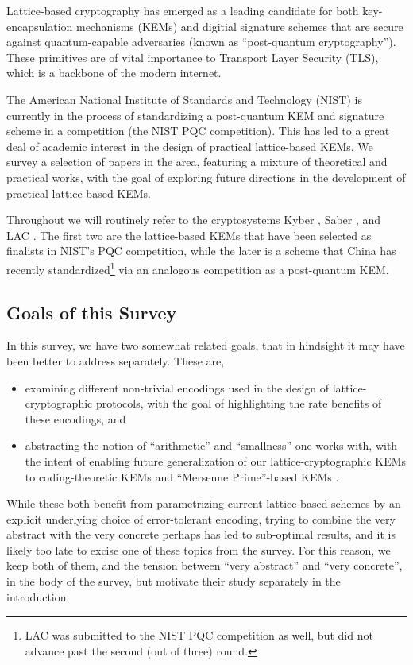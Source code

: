 Lattice-based cryptography has emerged as a leading candidate for both key-encapsulation mechanisms (KEMs) and digitial signature schemes that are secure against quantum-capable adversaries (known as ``post-quantum cryptography''). These primitives are of vital importance to Transport Layer Security (TLS), which is a backbone of the modern internet. 

The American National Institute of Standards and Technology (NIST) is currently in the process of standardizing a post-quantum KEM and signature scheme in a competition (the NIST PQC competition).
This has led to a great deal of academic interest in the design of practical lattice-based KEMs.
We survey a selection of papers in the area, featuring a mixture of theoretical and practical works, with the goal of exploring future directions in the development of practical lattice-based KEMs.

Throughout we will routinely refer to the cryptosystems Kyber \cite{KYBER-spec}, Saber \cite{AFRICACRYPT:DKRV18}, and LAC \cite{EPRINT:LLZJXHLW18}. The first two are the lattice-based KEMs that have been selected as finalists in NIST's PQC competition, while the later is a scheme that China has recently standardized\footnote{LAC was submitted to the NIST PQC competition as well, but did not advance past the second (out of three) round.} via an analogous competition as a post-quantum KEM.

\subsection{Goals of this Survey}

In this survey, we have two somewhat related goals, that in hindsight it may have been better to address separately.
These are,
\begin{itemize}
	\item examining different non-trivial encodings used in the design of lattice-cryptographic protocols, with the goal of highlighting the rate benefits of these encodings, and
	\item abstracting the notion of ``arithmetic'' and ``smallness'' one works with, with the intent of enabling future generalization of our lattice-cryptographic KEMs to coding-theoretic KEMs and ``Mersenne Prime''-based KEMs \cite{C:AJPS18}.
\end{itemize}
While these both benefit from parametrizing current lattice-based schemes by an explicit underlying choice of error-tolerant encoding, trying to combine the very abstract with the very concrete perhaps has led to sub-optimal results, and it is likely too late to excise one of these topics from the survey.
For this reason, we keep both of them, and the tension between ``very abstract'' and ``very concrete'', in the body of the survey, but motivate their study separately in the introduction.

